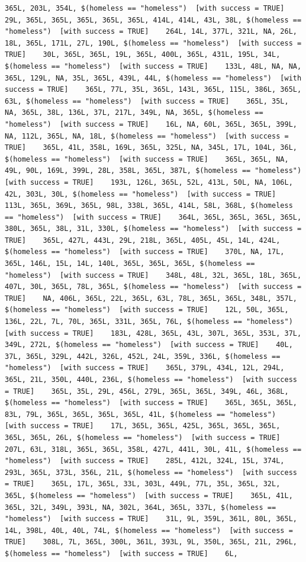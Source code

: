 \documentclass{tufte-book}\usepackage[]{graphicx}\usepackage[]{xcolor}
\makeatletter
\newenvironment{kframe}{%
 \def\at@end@of@kframe{}%
 \ifinner\ifhmode%
  \def\at@end@of@kframe{\end{minipage}}%
  \begin{minipage}{\columnwidth}%
 \fi\fi%
 \def\FrameCommand##1{\hskip\@totalleftmargin \hskip-\fboxsep
 \colorbox{shadecolor}{##1}\hskip-\fboxsep
     \hskip-\linewidth \hskip-\@totalleftmargin \hskip\columnwidth}%
 \MakeFramed {\advance\hsize-\width
   \@totalleftmargin\z@ \linewidth\hsize
   \@setminipage}}%
 {\par\unskip\endMakeFramed%
 \at@end@of@kframe}
\newenvironment{knitrout}{}{} %
\makeatother
\begin{document}
\begin{knitrout}
\begin{kframe}
\begin{verbatim}
365L, 203L, 354L, $(homeless == "homeless")  [with success = TRUE]    29L, 365L, 365L, 365L, 365L, 365L, 414L, 414L, 43L, 38L, $(homeless == "homeless")  [with success = TRUE]    264L, 14L, 377L, 321L, NA, 26L, 18L, 365L, 171L, 27L, 190L, $(homeless == "homeless")  [with success = TRUE]    30L, 365L, 365L, 19L, 365L, 400L, 365L, 431L, 195L, 34L, $(homeless == "homeless")  [with success = TRUE]    133L, 48L, NA, NA, 365L, 129L, NA, 35L, 365L, 439L, 44L, $(homeless == "homeless")  [with success = TRUE]    365L, 77L, 35L, 365L, 143L, 365L, 115L, 386L, 365L, 63L, $(homeless == "homeless")  [with success = TRUE]    365L, 35L, NA, 365L, 38L, 136L, 37L, 217L, 349L, NA, 365L, $(homeless == "homeless")  [with success = TRUE]    16L, NA, 60L, 365L, 365L, 399L, NA, 112L, 365L, NA, 18L, $(homeless == "homeless")  [with success = TRUE]    365L, 41L, 358L, 169L, 365L, 325L, NA, 345L, 17L, 104L, 36L, $(homeless == "homeless")  [with success = TRUE]    365L, 365L, NA, 49L, 90L, 169L, 399L, 28L, 358L, 365L, 387L, $(homeless == "homeless")  [with success = TRUE]    193L, 126L, 365L, 52L, 413L, 50L, NA, 106L, 42L, 303L, 30L, $(homeless == "homeless")  [with success = TRUE]    113L, 365L, 369L, 365L, 98L, 338L, 365L, 414L, 58L, 368L, $(homeless == "homeless")  [with success = TRUE]    364L, 365L, 365L, 365L, 365L, 380L, 365L, 38L, 31L, 330L, $(homeless == "homeless")  [with success = TRUE]    365L, 427L, 443L, 29L, 218L, 365L, 405L, 45L, 14L, 424L, $(homeless == "homeless")  [with success = TRUE]    370L, NA, 17L, 365L, 146L, 15L, 14L, 140L, 365L, 365L, 365L, $(homeless == "homeless")  [with success = TRUE]    348L, 48L, 32L, 365L, 18L, 365L, 407L, 30L, 365L, 78L, 365L, $(homeless == "homeless")  [with success = TRUE]    NA, 406L, 365L, 22L, 365L, 63L, 78L, 365L, 365L, 348L, 357L, $(homeless == "homeless")  [with success = TRUE]    12L, 50L, 365L, 136L, 22L, 7L, 70L, 365L, 331L, 365L, 76L, $(homeless == "homeless")  [with success = TRUE]    183L, 428L, 365L, 43L, 307L, 365L, 353L, 37L, 349L, 272L, $(homeless == "homeless")  [with success = TRUE]    40L, 37L, 365L, 329L, 442L, 326L, 452L, 24L, 359L, 336L, $(homeless == "homeless")  [with success = TRUE]    365L, 379L, 434L, 12L, 294L, 365L, 21L, 350L, 440L, 236L, $(homeless == "homeless")  [with success = TRUE]    365L, 35L, 29L, 456L, 279L, 365L, 365L, 349L, 46L, 368L, $(homeless == "homeless")  [with success = TRUE]    365L, 365L, 365L, 83L, 79L, 365L, 365L, 365L, 365L, 41L, $(homeless == "homeless")  [with success = TRUE]    17L, 365L, 365L, 425L, 365L, 365L, 365L, 365L, 365L, 26L, $(homeless == "homeless")  [with success = TRUE]    207L, 63L, 318L, 365L, 365L, 358L, 427L, 441L, 30L, 41L, $(homeless == "homeless")  [with success = TRUE]    285L, 412L, 324L, 15L, 374L, 293L, 365L, 373L, 356L, 21L, $(homeless == "homeless")  [with success = TRUE]    365L, 17L, 365L, 33L, 303L, 449L, 77L, 35L, 365L, 32L, 365L, $(homeless == "homeless")  [with success = TRUE]    365L, 41L, 365L, 32L, 349L, 393L, NA, 302L, 364L, 365L, 337L, $(homeless == "homeless")  [with success = TRUE]    31L, 9L, 359L, 361L, 80L, 365L, 14L, 398L, 40L, 40L, 74L, $(homeless == "homeless")  [with success = TRUE]    308L, 7L, 365L, 300L, 361L, 393L, 9L, 350L, 365L, 21L, 296L, $(homeless == "homeless")  [with success = TRUE]    6L, 
\end{verbatim}
\end{kframe}
\end{knitrout}
\end{document}
